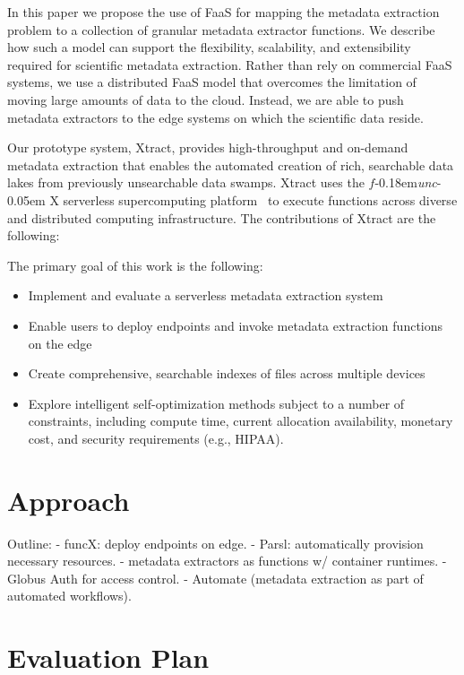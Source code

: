\documentclass[sigconf]{acmart}
\newcommand{\name}{Xtract}
\newcommand{\funcx}{$f$\kern-0.18em\emph{unc}\kern-0.05em X}
\begin{document}
In this paper we propose the use of FaaS for mapping the metadata extraction problem to a 
collection of granular metadata extractor functions. 
We describe how such a model can support the flexibility, scalability, and extensibility required
for scientific metadata extraction. 
Rather than rely on commercial FaaS systems, we use a distributed FaaS model 
that overcomes the limitation of moving large amounts of data to the cloud. 
Instead, we are able to push
metadata extractors to the edge systems on which the scientific data reside. 

Our prototype system, \name{}, provides high-throughput and on-demand metadata 
extraction that enables the automated creation of rich, searchable data lakes from previously unsearchable data swamps. 
\name{} uses the \funcx{} serverless supercomputing platform~\cite{chard2019serverless}
to execute functions across diverse and distributed computing infrastructure.
The contributions of \name{} are the following: 



The primary goal of this work is the following: 

\begin{itemize}
\item Implement and evaluate a serverless metadata extraction system
\item Enable users to deploy endpoints and invoke metadata extraction functions on the edge
\item Create comprehensive, searchable indexes of files across multiple devices
\item Explore intelligent self-optimization methods subject to a number of constraints, including compute time, 
current allocation availability, monetary cost, and security requirements (e.g., HIPAA).
\end{itemize}


\section{Approach}
\label{sec:approach}
Outline: 
- funcX: deploy endpoints on edge. 
     - Parsl: automatically provision necessary resources. 
- metadata extractors as functions w/ container runtimes. 
- Globus Auth for access control. 
- Automate (metadata extraction as part of automated workflows). 

\section{Evaluation Plan}
\label{sec:eval}
\end{document}
